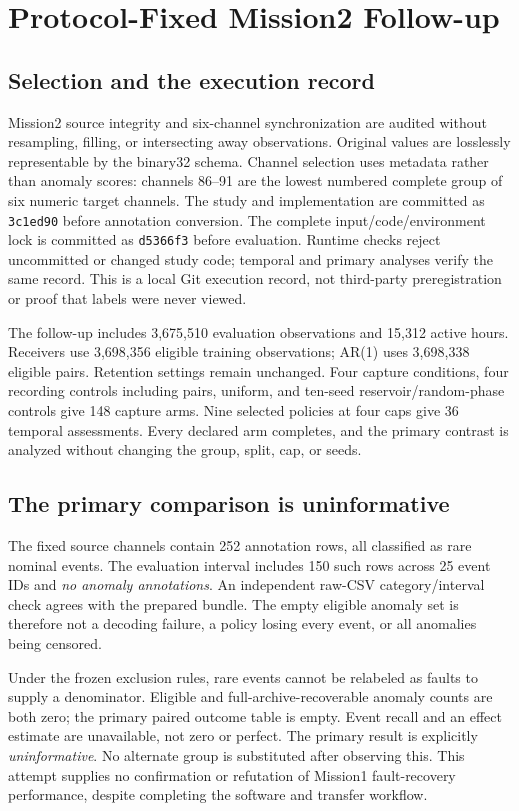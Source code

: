 \section{Protocol-Fixed Mission2 Follow-up}
\label{sec:mission2}
\subsection{Selection and the execution record}
Mission2 source integrity and six-channel synchronization are audited without
resampling, filling, or intersecting away observations. Original values are
losslessly representable by the binary32 schema. Channel selection uses metadata
rather than anomaly scores: channels 86--91 are the lowest numbered complete group
of six numeric target channels. The study and implementation are committed as
\texttt{3c1ed90} before annotation conversion. The complete input/code/environment
lock is committed as \texttt{d5366f3} before evaluation. Runtime checks reject
uncommitted or changed study code; temporal and primary analyses verify the same
record. This is a local Git execution record, not third-party preregistration or
proof that labels were never viewed.

The follow-up includes 3,675,510 evaluation observations and 15,312 active hours.
Receivers use 3,698,356 eligible training observations; AR(1) uses 3,698,338 eligible
pairs. Retention settings remain unchanged. Four capture conditions, four recording
controls including pairs, uniform, and ten-seed reservoir/random-phase controls
give 148 capture arms. Nine selected policies at four caps give 36 temporal
assessments. Every declared arm completes, and the primary contrast is analyzed
without changing the group, split, cap, or seeds.

\subsection{The primary comparison is uninformative}
The fixed source channels contain 252 annotation rows, all classified as rare
nominal events. The evaluation interval includes 150 such rows across 25 event IDs
and \emph{no anomaly annotations}. An independent raw-CSV category/interval check
agrees with the prepared bundle. The empty eligible anomaly set is therefore not
a decoding failure, a policy losing every event, or all anomalies being censored.

Under the frozen exclusion rules, rare events cannot be relabeled as faults to
supply a denominator. Eligible and full-archive-recoverable anomaly counts are
both zero; the primary paired outcome table is empty. Event recall and an effect
estimate are unavailable, not zero or perfect. The primary result is explicitly
\emph{uninformative}. No alternate group is substituted after observing this.
This attempt supplies no confirmation or refutation of Mission1 fault-recovery
performance, despite completing the software and transfer workflow.

